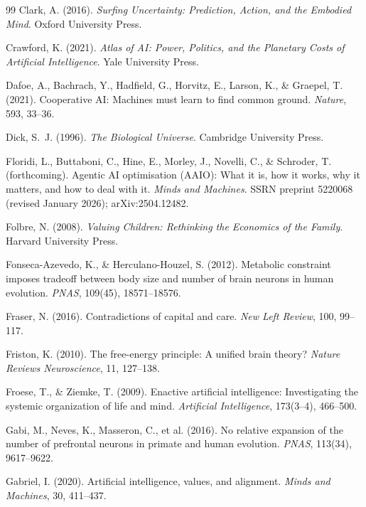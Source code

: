 \documentclass[11pt,a4paper,twocolumn]{article}
\begin{document}
\begin{thebibliography}{99}
 Clark, A. (2016). \textit{Surfing Uncertainty: Prediction, Action, and the Embodied Mind}. Oxford University Press.

 Crawford, K. (2021). \textit{Atlas of AI: Power, Politics, and the Planetary Costs of Artificial Intelligence}. Yale University Press.

 Dafoe, A., Bachrach, Y., Hadfield, G., Horvitz, E., Larson, K., \& Graepel, T. (2021). Cooperative AI: Machines must learn to find common ground. \textit{Nature}, 593, 33--36.

 Dick, S.~J. (1996). \textit{The Biological Universe}. Cambridge University Press.

 Floridi, L., Buttaboni, C., Hine, E., Morley, J., Novelli, C., \& Schroder, T. (forthcoming). Agentic AI optimisation (AAIO): What it is, how it works, why it matters, and how to deal with it. \textit{Minds and Machines}. SSRN preprint 5220068 (revised January 2026); arXiv:2504.12482.

 Folbre, N. (2008). \textit{Valuing Children: Rethinking the Economics of the Family}. Harvard University Press.

 Fonseca-Azevedo, K., \& Herculano-Houzel, S. (2012). Metabolic constraint imposes tradeoff between body size and number of brain neurons in human evolution. \textit{PNAS}, 109(45), 18571--18576.

 Fraser, N. (2016). Contradictions of capital and care. \textit{New Left Review}, 100, 99--117.

 Friston, K. (2010). The free-energy principle: A unified brain theory? \textit{Nature Reviews Neuroscience}, 11, 127--138.

 Froese, T., \& Ziemke, T. (2009). Enactive artificial intelligence: Investigating the systemic organization of life and mind. \textit{Artificial Intelligence}, 173(3--4), 466--500.

 Gabi, M., Neves, K., Masseron, C., et al. (2016). No relative expansion of the number of prefrontal neurons in primate and human evolution. \textit{PNAS}, 113(34), 9617--9622.

 Gabriel, I. (2020). Artificial intelligence, values, and alignment. \textit{Minds and Machines}, 30, 411--437.


\end{thebibliography}
\end{document}

